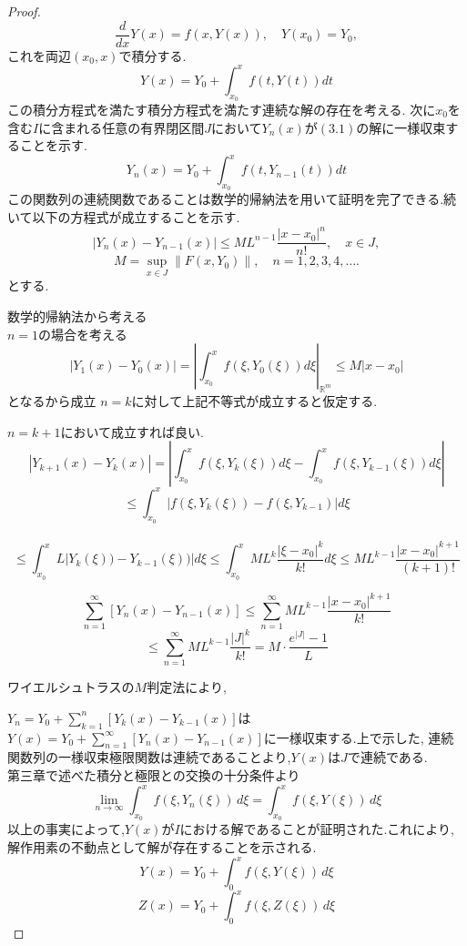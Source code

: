\documentclass[12pt]{bxjsarticle}
\begin{document}
\begin{proof}
\[\frac{d}{dx}Y(x) = f(x, Y(x)), \quad Y(x_{0}) = Y_{0},\]
これを両辺$(x_{0},x)$で積分する.
 \[Y(x)=Y_{0}+\displaystyle \int_{x_{0}}^{x} f(t,Y(t)) dt\]
この積分方程式を満たす積分方程式を満たす連続な解の存在を考える.
       次に$x_{0}$を含む$I$に含まれる任意の有界閉区間$J$において$Y_{n}(x)$が$(3.1)$の解に一様収束することを示す.
       \[Y_{n}(x)=Y_{0}+\displaystyle \int_{x_{0}}^{x} f(t,Y_{n-1}(t)) dt\]
       この関数列の連続関数であることは数学的帰納法を用いて証明を完了できる.続いて以下の方程式が成立することを示す.
\[
| Y_{n}(x) - Y_{n-1}(x) | \leq M L^{n-1} \frac{|x - x_0|^{n}}{n!}, \quad x \in J,
\]
\[
M = \sup_{x \in J} \|F(x, Y_0)\|, \quad n = 1, 2, 3, 4, \dots.
\]
とする.

    数学的帰納法から考える\\
    $n=1$の場合を考える
    \[\left| Y_{1}(x)-Y_{0}(x) \right| =\left|\displaystyle \int_{x_{0}}^{x}  f(\xi,Y_{0}(\xi)) d\xi \right|_{\mathbb{R}^{m}}\leq M|x-x_{0}| \]
となるから成立
$n=k$に対して上記不等式が成立すると仮定する.

$n=k+1$において成立すれば良い.
\[\left| Y_{k+1}(x)-Y_{k}(x) \right| =  \left|\displaystyle \int_{x_{0}}^{x}  f(\xi,Y_{k}(\xi)) d\xi -\displaystyle \int_{x_{0}}^{x}  f(\xi,Y_{k-1}(\xi)) d\xi\right| \]
\[\leq \displaystyle  \int_{x_{0}}^{x}  \left|f(\xi,Y_{k}(\xi))-f(\xi,Y_{k-1})\right| d\xi \]\
\[\leq \displaystyle  \int_{x_{0}}^{x}  L\left|Y_{k}(\xi))-Y_{k-1}(\xi))\right| d\xi \leq \displaystyle  \int_{x_{0}}^{x}ML^{k} \frac{\left|\xi - x_0\right|^{k}}{k!} d\xi \leq ML^{k-1}\frac{\left|x - x_0\right|^{k+1}}{(k+1)!}\]


\[ \displaystyle\sum_{n=1}^{\infty}[Y_{n}(x)-Y_{n-1}(x)] \leq  \displaystyle\sum_{n=1}^{\infty}ML^{k-1}\frac{\left|x - x_0\right|^{k+1}}{k!}\]
\[\leq \displaystyle\sum_{n=1}^{\infty}ML^{k-1}\frac{\left|J\right|^{k}}{k!}=M \cdot \frac{e^{|J|}-1}{L}\]

ワイエルシュトラスの$M$判定法により,

$Y_{n}=Y_{0}+\displaystyle\sum_{k=1}^{n} [Y_{k}(x)-Y_{k-1}(x)]$は$Y(x)=Y_{0}+\displaystyle\sum_{n=1}^{\infty} [Y_{n}(x)-Y_{n-1}(x)]$に一様収束する.上で示した, 連続関数列の一様収束極限関数は連続であることより,$Y(x)$は$J$で連続である.\\
第三章で述べた積分と極限との交換の十分条件より
    \[\lim_{n \to \infty} \displaystyle \int_{x_{0}}^{x} f(\xi,Y_{n}(\xi)) \, d\xi = \displaystyle \int_{x_{0}}^{x} f(\xi,Y(\xi)) \, d\xi \]
以上の事実によって,$Y(x)$が$I$における解であることが証明された.これにより,解作用素の不動点として解が存在することを示される.
\[
Y(x) = Y_{0} + \displaystyle \int_{0}^{x} f(\xi, Y(\xi)) \, d\xi
\]
\[
Z(x) = Y_{0} + \displaystyle \int_{0}^{x} f(\xi, Z(\xi)) \, d\xi
\]


\end{proof}
\end{document}
